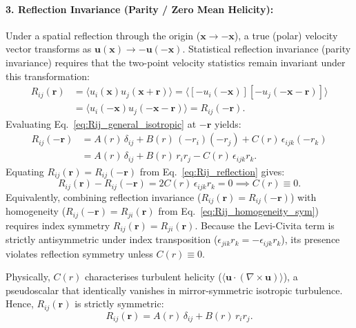\documentclass[lineno]{jfm}
\begin{document}
\paragraph{3. Reflection Invariance (Parity / Zero Mean Helicity):}
Under a spatial reflection through the origin ($\mathbf{x} \to -\mathbf{x}$), a true (polar) velocity vector transforms as $\mathbf{u}(\mathbf{x}) \to -\mathbf{u}(-\mathbf{x})$. Statistical reflection invariance (parity invariance) requires that the two-point velocity statistics remain invariant under this transformation:
\begin{align}
R_{ij}(\mathbf{r}) &= \langle u_i(\mathbf{x}) u_j(\mathbf{x}+\mathbf{r}) \rangle = \langle [-u_i(-\mathbf{x})] [-u_j(-\mathbf{x}-\mathbf{r})] \rangle \nonumber \\
&= \langle u_i(-\mathbf{x}) u_j(-\mathbf{x}-\mathbf{r}) \rangle = R_{ij}(-\mathbf{r}).
\label{eq:Rij_reflection}
\end{align}
Evaluating Eq.~\eqref{eq:Rij_general_isotropic} at $-\mathbf{r}$ yields:
\begin{align}
R_{ij}(-\mathbf{r}) &= A(r)\,\delta_{ij} + B(r)\,(-r_i)(-r_j) + C(r)\,\epsilon_{ijk}(-r_k) \nonumber \\
&= A(r)\,\delta_{ij} + B(r)\,r_i r_j - C(r)\,\epsilon_{ijk} r_k.
\end{align}
Equating $R_{ij}(\mathbf{r}) = R_{ij}(-\mathbf{r})$ from Eq.~\eqref{eq:Rij_reflection} gives:
\begin{equation}
R_{ij}(\mathbf{r}) - R_{ij}(-\mathbf{r}) = 2C(r)\,\epsilon_{ijk} r_k = 0 \implies C(r) \equiv 0.
\end{equation}
Equivalently, combining reflection invariance ($R_{ij}(\mathbf{r}) = R_{ij}(-\mathbf{r})$) with homogeneity ($R_{ij}(-\mathbf{r}) = R_{ji}(\mathbf{r})$ from Eq.~\eqref{eq:Rij_homogeneity_sym}) requires index symmetry $R_{ij}(\mathbf{r}) = R_{ji}(\mathbf{r})$. Because the Levi-Civita term is strictly antisymmetric under index transposition ($\epsilon_{jik} r_k = -\epsilon_{ijk} r_k$), its presence violates reflection symmetry unless $C(r) \equiv 0$.

Physically, $C(r)$ characterises turbulent helicity ($\langle \mathbf{u} \cdot (\nabla \times \mathbf{u}) \rangle$), a pseudoscalar that identically vanishes in mirror-symmetric isotropic turbulence. Hence, $R_{ij}(\mathbf{r})$ is strictly symmetric:
\begin{equation}
R_{ij}(\mathbf{r}) = A(r)\,\delta_{ij} + B(r)\,r_i r_j.
\label{eq:Rij_symmetric}
\end{equation}
\end{document}
